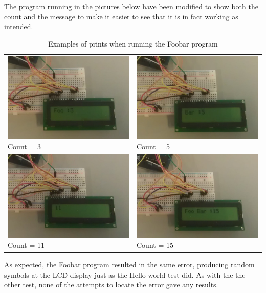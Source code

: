 The program running in the pictures below have been modified to show both the count and the message to make it easier to see that it is in fact working as intended.
\begin{table}[h]
\begin{tabular}{p{}p{}}
\includegraphics[width=8cm]{billeder/test_foobar_1.jpg}
Count = 3
 &
\includegraphics[width=8cm]{billeder/test_foobar_2.jpg}
Count = 5
\\ 
\includegraphics[width=8cm]{billeder/test_foobar_3.jpg}
Count = 11
 & 
\includegraphics[width=8cm]{billeder/test_foobar_4.jpg}
Count = 15
 \\ 
\end{tabular} 
\caption{Examples of prints when running the Foobar program}
\end{table}

As expected, the Foobar program resulted in the same error, producing random symbols at the LCD display just as the Hello world test did. As with the the other test, none of the attempts to locate the error gave any results.